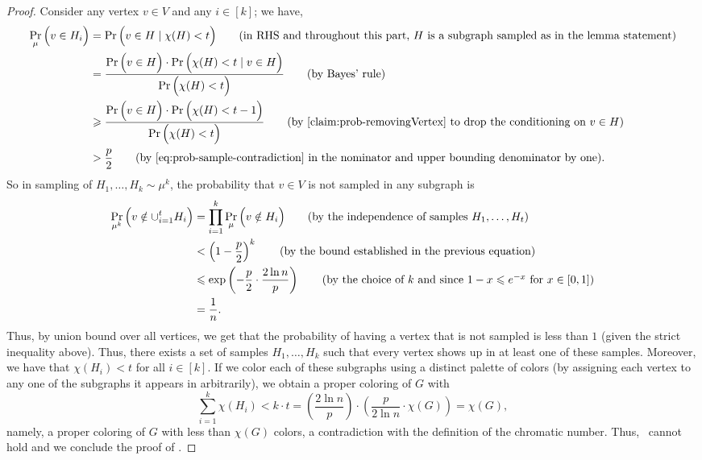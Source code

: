 \documentclass[11pt]{article}
\theoremstyle{definition}
\renewcommand{\leq}{\leqslant}
\renewcommand{\geq}{\geqslant}
\newcommand{\Paren}[1]{\Big(#1\Big)}
\newcommand{\paren}[1]{\ensuremath{\left(#1\right)}\xspace}
\DeclareMathOperator*{\Prob}{\ensuremath{\textnormal{Pr}}}
\renewcommand{\Pr}{\Prob}
\begin{document}
\begin{proof}
    Consider any vertex $v \in V$ and any $i\in[k]$; we have,
    \begin{align*}
        \Pr_{\mu}\Paren{v\in H_i} &= \Pr\Paren{v \in H \mid \chi(H) < t} \tag{in RHS and throughout this part, $H$ is a subgraph sampled as in the lemma statement} \\
        &=\frac{\Pr \Paren{v\in H} \cdot \Pr\Paren{\chi(H)< t \mid v \in H}}{\Pr\Paren{\chi(H)< t}} \tag{by Bayes' rule}\\
        &\geq\frac{\Pr \Paren{v\in H} \cdot \Pr\Paren{\chi(H)< t-1}}{\Pr\Paren{\chi(H)< t}} \tag{by~\Cref{claim:prob-removingVertex} to drop the conditioning on $v \in H$}\\
        &> \frac{p}{2} \tag{by~\Cref{eq:prob-sample-contradiction} in the nominator and upper bounding denominator by one}. 
    \end{align*}
    So in sampling of $H_1,\ldots,H_k \sim \mu^k$, the probability that $v\in V$ is not sampled in any subgraph is
    \begin{align*}
    \Pr_{\mu^k}\Paren{v \notin \cup_{i=1}^t H_i} &= \prod_{i=1}^{k} \Pr_{\mu}\Paren{v \notin H_i} \tag{by the independence of samples $H_1,\ldots,H_t$} \\
    &< \paren{1-\frac{p}{2}}^{k} \tag{by the bound established in the previous equation} \\
    &\leq \exp\paren{-\frac{p}{2} \cdot \frac{2\ln{n}}{p}} \tag{by the choice of $k$ and since $1-x \leq e^{-x}$ for $x \in [0,1]$} \\
    &= \frac{1}{n}.
    \end{align*}
    Thus, by union bound over all vertices, we get that the probability of having a vertex that is not sampled is less than $1$ (given the strict inequality above). Thus, there exists a set of samples $H_1, \ldots, H_k$ such that every vertex shows up in at least one of 
    these samples. Moreover, we have that $\chi(H_i) < t$ for all $i \in [k]$. If we color each of these subgraphs using a distinct palette of colors (by assigning each vertex to any one of the subgraphs it appears in arbitrarily), 
    we obtain a proper coloring of $G$ with 
    \[
    	\sum_{i=1}^{k} \chi(H_i) < k \cdot t = \paren{\frac{2\ln{n}}{p}} \cdot \paren{\frac{p}{2\ln{n}} \cdot \chi(G)} = \chi(G), 
    \]
    namely, a proper coloring of $G$ with less than $\chi(G)$ colors, a contradiction with the definition of the chromatic number. Thus,~ cannot hold
    and we  conclude the proof of .  
\end{proof}
\end{document}
